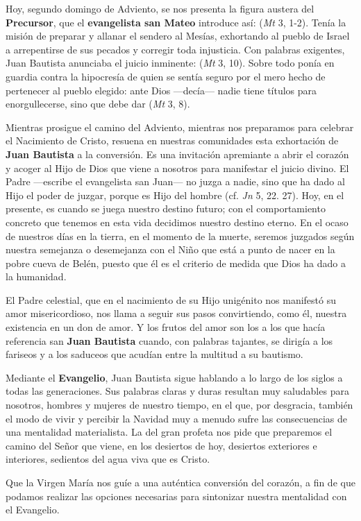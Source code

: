 \begin{body}		
	[\ldots{}] Hoy, segundo domingo de Adviento, se nos presenta la figura austera del \textbf{Precursor}, que el \textbf{evangelista san Mateo} introduce así:  (\emph{Mt} 3, 1-2). Tenía la misión de preparar y allanar el sendero al Mesías, exhortando al pueblo de Israel a arrepentirse de sus pecados y corregir toda injusticia. Con palabras exigentes, Juan Bautista anunciaba el juicio inminente:  (\emph{Mt} 3, 10). Sobre todo ponía en guardia contra la hipocresía de quien se sentía seguro por el mero hecho de pertenecer al pueblo elegido: ante Dios ---decía--- nadie tiene títulos para enorgullecerse, sino que debe dar  (\emph{Mt} 3, 8).
	
	Mientras prosigue el camino del Adviento, mientras nos preparamos para celebrar el Nacimiento de Cristo, resuena en nuestras comunidades esta exhortación de \textbf{Juan Bautista} a la conversión. Es una invitación apremiante a abrir el corazón y acoger al Hijo de Dios que viene a nosotros para manifestar el juicio divino. El Padre ---escribe el evangelista san Juan--- no juzga a nadie, sino que ha dado al Hijo el poder de juzgar, porque es Hijo del hombre (cf. \emph{Jn} 5, 22. 27). Hoy, en el presente, es cuando se juega nuestro destino futuro; con el comportamiento concreto que tenemos en esta vida decidimos nuestro destino eterno. En el ocaso de nuestros días en la tierra, en el momento de la muerte, seremos juzgados según nuestra semejanza o desemejanza con el Niño que está a punto de nacer en la pobre cueva de Belén, puesto que él es el criterio de medida que Dios ha dado a la humanidad.
	
	El Padre celestial, que en el nacimiento de su Hijo unigénito nos manifestó su amor misericordioso, nos llama a seguir sus pasos convirtiendo, como él, nuestra existencia en un don de amor. Y los frutos del amor son los  a los que hacía referencia san \textbf{Juan Bautista} cuando, con palabras tajantes, se dirigía a los fariseos y a los saduceos que acudían entre la multitud a su bautismo.
	
	Mediante el \textbf{Evangelio}, Juan Bautista sigue hablando a lo largo de los siglos a todas las generaciones. Sus palabras claras y duras resultan muy saludables para nosotros, hombres y mujeres de nuestro tiempo, en el que, por desgracia, también el modo de vivir y percibir la Navidad muy a menudo sufre las consecuencias de una mentalidad materialista. La  del gran profeta nos pide que preparemos el camino del Señor que viene, en los desiertos de hoy, desiertos exteriores e interiores, sedientos del agua viva que es Cristo.
	
	Que la Virgen María nos guíe a una auténtica conversión del corazón, a fin de que podamos realizar las opciones necesarias para sintonizar nuestra mentalidad con el Evangelio.
\end{body}	

